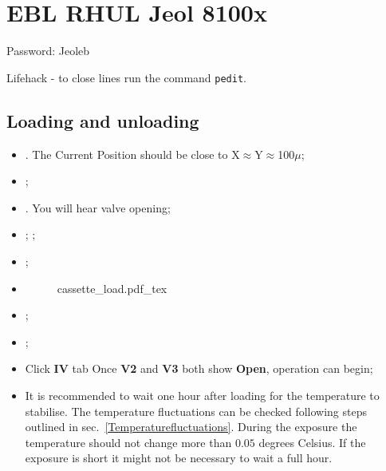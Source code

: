 
\section{EBL RHUL Jeol 8100x}
Password: Jeoleb%

\begin{framed}\noindent
  Lifehack - to close lines run the command \texttt{pedit}.
\end{framed}

\subsection{Loading and unloading}
\label{sec:loading-unloading}

\begin{itemize}
\item  {}.  The {Current Position} should be close to X$\approx$Y$\approx$100$\mu$;
\item {};
\item {}.
  You will hear valve opening;
\item {}; ;
\item   {};
\item {}
  \begin{figure}[h]
    \centering
    \def\svgwidth{8cm}%
    {cassette_load.pdf_tex}
  \end{figure}

\item {};
\item {};
\item  Click \textbf{IV}  tab \ira  Once \textbf{V2}  and \textbf{V3}  both show
  \textbf{Open}, operation can begin;
\item It is  recommended to wait one  hour after loading for  the temperature to
  stabilise.   The  temperature  fluctuations  can be  checked  following  steps
  outlined  in  sec.~\ref{Temperaturefluctuations}.   During  the  exposure  the
  temperature  should not  change  more  than $0.05$  degrees  Celsius.  If  the
  exposure is short it might not be necessary to wait a full hour.
\end{itemize}

